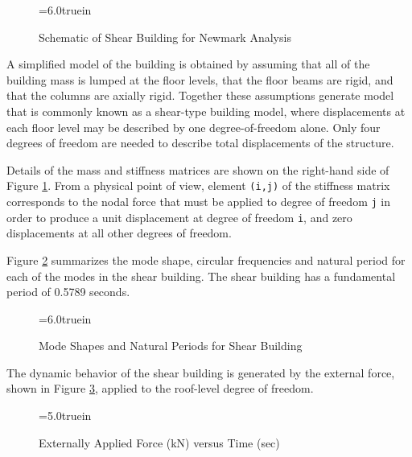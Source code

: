 \begin{figure} [h]
\epsfxsize=6.0truein
\centerline{}
\caption{Schematic of Shear Building for Newmark Analysis}
\label{fig:solution-shear-building}
\end{figure}

\vspace{0.15 in}\noindent
A simplified model of the building is obtained by
assuming that all of the building mass is lumped at the floor levels,
that the floor beams are rigid, and that the columns are axially rigid.
Together these assumptions generate model that is commonly
known as a shear-type building model, where displacements at
each floor level may be described by one degree-of-freedom alone.
Only four degrees of freedom are needed to
describe total displacements of the structure.

\vspace{0.15 in}
\noindent\hspace{0.5 in}
Details of the mass and stiffness matrices are shown on the right-hand
side of Figure \ref{fig:solution-shear-building}. From a physical point
of view, element {\tt (i,j)} of the stiffness matrix corresponds to the
nodal force that must be applied to degree of freedom {\tt j} in order
to produce a unit displacement at degree of freedom {\tt i}, and zero
displacements at all other degrees of freedom.

\vspace{0.15 in}
\noindent\hspace{0.5 in}
Figure \ref{fig:solution-eigen-problem} summarizes the
mode shape, circular frequencies and natural period for each of
the modes in the shear building.
The shear building has a fundamental period of 0.5789 seconds.

\vspace{0.10 in}
\begin{figure} [th]
\epsfxsize=6.0truein
\centerline{}
\caption{Mode Shapes and Natural Periods for Shear Building}
\label{fig:solution-eigen-problem}
\end{figure}

\vspace{0.15 in}\noindent
The dynamic behavior of the shear building is generated by the
external force, shown in Figure \ref{fig:applied-force-versus-time},
applied to the roof-level degree of freedom.

\begin{figure} [h]
\epsfxsize=5.0truein
\centerline{}
\caption{Externally Applied Force (kN) versus Time (sec)}
\label{fig:applied-force-versus-time}
\end{figure}

